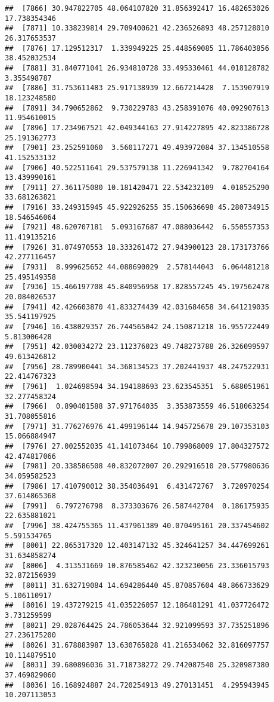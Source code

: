 \documentclass[
]{article}
\begin{document}
\begin{verbatim}
##  [7866] 30.947822705 48.064107820 31.856392417 16.482653026 17.738354346
##  [7871] 10.338239814 29.709400621 42.236526893 48.257128010 26.317653537
##  [7876] 17.129512317  1.339949225 25.448569085 11.786403856 38.452032534
##  [7881] 31.840771041 26.934810728 33.495330461 44.018128782  3.355498787
##  [7886] 31.753611483 25.917138939 12.667214428  7.153907919 18.123248580
##  [7891] 34.790652862  9.730229783 43.258391076 40.092907613 11.954610015
##  [7896] 17.234967521 42.049344163 27.914227895 42.823386728 25.191362773
##  [7901] 23.252591060  3.560117271 49.493972084 37.134510558 41.152533132
##  [7906] 40.522511641 29.537579138 11.226941342  9.782704164 13.439990161
##  [7911] 27.361175080 10.181420471 22.534232109  4.018525290 33.681263821
##  [7916] 33.249315945 45.922926255 35.150636698 45.280734915 18.546546064
##  [7921] 48.620707181  5.093167687 47.088036442  6.550557353 11.419135216
##  [7926] 31.074970553 18.333261472 27.943900123 28.173173766 42.277116457
##  [7931]  8.999625652 44.088690029  2.578144043  6.064481218 25.495149358
##  [7936] 15.466197708 45.840956958 17.828557245 45.197562478 20.084026537
##  [7941] 42.426603870 41.833274439 42.031684658 34.641219035 35.541197925
##  [7946] 16.438029357 26.744565042 24.150871218 16.955722449  5.813006428
##  [7951] 42.030034272 23.112376023 49.748273788 26.326099597 49.613426812
##  [7956] 28.789900441 34.368134523 37.202441937 48.247522931 22.414767323
##  [7961]  1.024698594 34.194188693 23.623545351  5.688051961 32.277458324
##  [7966]  0.890401588 37.971764035  3.353873559 46.518063254 31.708055816
##  [7971] 31.776276976 41.499196144 14.945725678 29.107353103 15.066884947
##  [7976] 27.002552035 41.141073464 10.799868009 17.804327572 42.474817066
##  [7981] 20.338586508 40.832072007 20.292916510 20.577980636 34.059582523
##  [7986] 17.410790012 38.354036491  6.431472767  3.720970254 37.614865368
##  [7991]  6.797276798  8.373303676 26.587442704  0.186175935 22.635881021
##  [7996] 38.424755365 11.437961389 40.070495161 20.337454602  5.591534765
##  [8001] 22.865317320 12.403147132 45.324641257 34.447699261 31.634858274
##  [8006]  4.313531669 10.876585462 42.323230056 23.336015793 32.872156939
##  [8011] 31.632719084 14.694286440 45.870857604 48.866733629  5.106110917
##  [8016] 19.437279215 41.035226057 12.186481291 41.037726472  3.731259599
##  [8021] 29.028764425 24.786053644 32.921099593 37.735251896 27.236175200
##  [8026] 31.678883987 13.630765828 41.216534062 32.816097757 10.114879510
##  [8031] 39.680896036 31.718738272 29.742087540 25.320987380 37.469829060
##  [8036] 16.168924887 24.720254913 49.270131451  4.295943945 10.207113053

\end{verbatim}
\end{document}
